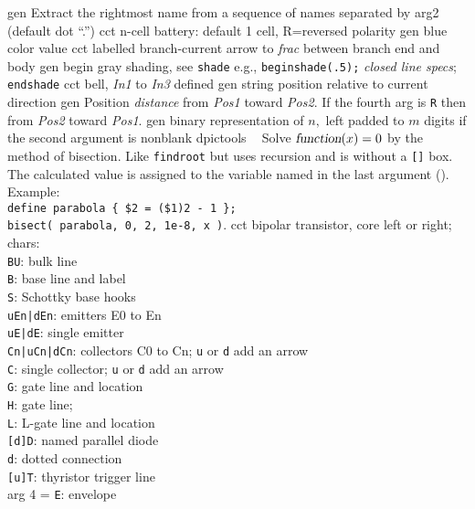 %
%
  {gen}%
  {Extract the rightmost name from a sequence of names separated by arg2
   (default dot ``.'')}%
%
  {cct}%
  {n-cell battery: default 1 cell,
  R=reversed polarity}%
%
  {gen}%
  {blue color value}%
%
  {cct}%
  {labelled branch-current arrow to {\sl frac} between branch end and body
    }%
%
  {gen}%
  {begin gray shading, see {\tt shade}%
   e.g., {\tt beginshade(.5);} {\sl closed line specs}; {\tt endshade}}%
%
  {cct}%
  {bell, {\sl In1} to {\sl In3} defined
   }%
%
  {gen}%
  {string position relative to current direction}%
%
  {gen}%
  {Position {\sl distance} from {\sl Pos1} toward {\sl Pos2}.  If
   the fourth arg is {\tt R} then from {\sl Pos2} toward {\sl Pos1}.}%
%
  {gen}%
  {binary representation of $n,$ left padded to $m$ digits if the second
   argument is nonblank}%
%
  {dpictools}%
  {$\;\;$ Solve $\hbox{\sl function}(x) = 0$ by the method of 
   bisection.
   Like {\tt findroot} but uses recursion and is without a {\tt[]} box.
   The calculated value is assigned to the variable named in the
   last argument (). Example:\\
   {\tt define parabola \{ \$2 = (\$1)2 - 1 \};\\
   bisect( parabola, 0, 2, 1e-8, x )}. }%
%
  {cct}%
  { bipolar transistor, core left or right; chars:\\
   {\tt BU}: bulk line\\
   {\tt B}: base line and label\\
   {\tt S}: Schottky base hooks\\
   {\tt uEn|dEn}: emitters E0 to En\\
   {\tt uE|dE}: single emitter\\
   {\tt Cn|uCn|dCn}: collectors C0 to Cn; {\tt u} or {\tt d} add an arrow\\
   {\tt C}: single collector; {\tt u} or {\tt d} add an arrow\\
   {\tt G}: gate line and location\\
   {\tt H}: gate line;\\
   {\tt L}: L-gate line and location\\
   {\tt [d]D}: named parallel diode\\
   {\tt d}: dotted connection\\
   {\tt [u]T}: thyristor trigger line\\
   arg 4 = {\tt E}: envelope
    }%
